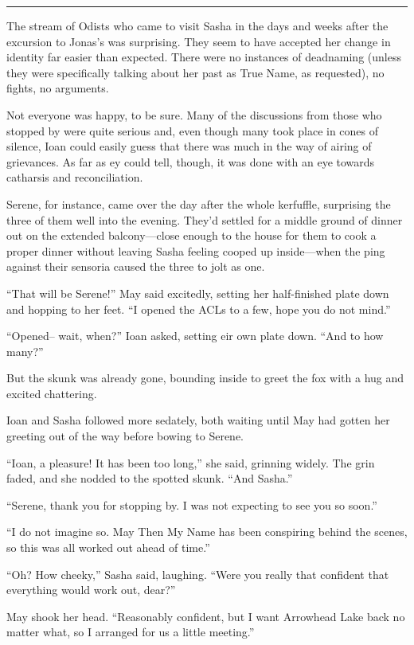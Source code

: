 \begin{center}\rule{0.5\linewidth}{0.5pt}\end{center}

The stream of Odists who came to visit Sasha in the days and weeks after the excursion to Jonas's was surprising. They seem to have accepted her change in identity far easier than expected. There were no instances of deadnaming (unless they were specifically talking about her past as True Name, as requested), no fights, no arguments.

Not everyone was happy, to be sure. Many of the discussions from those who stopped by were quite serious and, even though many took place in cones of silence, Ioan could easily guess that there was much in the way of airing of grievances. As far as ey could tell, though, it was done with an eye towards catharsis and reconciliation.

Serene, for instance, came over the day after the whole kerfuffle, surprising the three of them well into the evening. They'd settled for a middle ground of dinner out on the extended balcony—close enough to the house for them to cook a proper dinner without leaving Sasha feeling cooped up inside—when the ping against their sensoria caused the three to jolt as one.

``That will be Serene!'' May said excitedly, setting her half-finished plate down and hopping to her feet. ``I opened the ACLs to a few, hope you do not mind.''

``Opened-- wait, when?'' Ioan asked, setting eir own plate down. ``And to how many?''

But the skunk was already gone, bounding inside to greet the fox with a hug and excited chattering.

Ioan and Sasha followed more sedately, both waiting until May had gotten her greeting out of the way before bowing to Serene.

``Ioan, a pleasure! It has been too long,'' she said, grinning widely. The grin faded, and she nodded to the spotted skunk. ``And Sasha.''

``Serene, thank you for stopping by. I was not expecting to see you so soon.''

``I do not imagine so. May Then My Name has been conspiring behind the scenes, so this was all worked out ahead of time.''

``Oh? How cheeky,'' Sasha said, laughing. ``Were you really that confident that everything would work out, dear?''

May shook her head. ``Reasonably confident, but I want Arrowhead Lake back no matter what, so I arranged for us a little meeting.''

